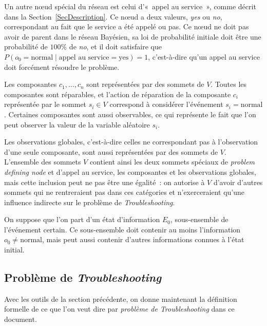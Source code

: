 \documentclass[a4paper,11pt]{article}
\theoremstyle{plain}
\theoremstyle{definition}
\begin{document}
Un autre nœud spécial du réseau est celui d'«~appel au service~», comme décrit dans la Section~\ref{SecDescription}. Ce nœud a deux valeurs, \emph{yes} ou \emph{no}, correspondant au fait que le service a été appelé ou pas. Ce nœud ne doit pas avoir de parent dans le réseau Bayésien, sa loi de probabilité initiale doit être une probabilité de $100\%$ de \emph{no}, et il doit satisfaire que $P(o_0 = \text{normal} \mid \text{appel au service} = \text{yes}) = 1$, c'est-à-dire qu'un appel au service doit forcément résoudre le problème.

Les composantes $c_1, \dotsc, c_n$ sont représentées par des sommets de $V$. Toutes les composantes sont réparables, et l'action de réparation de la composante $c_i$ représentée par le sommet $s_i \in V$ correspond à considérer l'événement $s_i = \text{normal}$. Certaines composantes sont aussi observables, ce qui représente le fait que l'on peut observer la valeur de la variable aléatoire $s_i$.

Les observations globales, c'est-à-dire celles ne correspondant pas à l'observation d'une seule composante, sont aussi représentées par des sommets de $V$. L'ensemble des sommets $V$ contient ainsi les deux sommets spéciaux de \emph{problem defining node} et d'appel au service, les composantes et les observations globales, mais cette inclusion peut ne pas être une égalité~: on autorise à $V$ d'avoir d'autres sommets qui ne rentreraient pas dans ces catégories et n'exerceraient qu'une influence indirecte sur le problème de \emph{Troubleshooting}.

On suppose que l'on part d'un état d'information $E_0$, sous-ensemble de l'événement certain. Ce sous-ensemble doit contenir au moins l'information $o_0 \neq \text{normal}$, mais peut aussi contenir d'autres informations connues à l'état initial.

\subsection{Problème de \emph{Troubleshooting}}
\label{SecProbTrouble}

Avec les outils de la section précédente, on donne maintenant la définition formelle de ce que l'on veut dire par \emph{problème de Troubleshooting} dans ce document.
\end{document}
